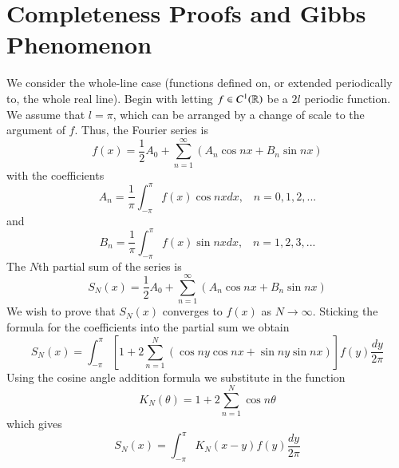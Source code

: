 \section{Completeness Proofs and Gibbs Phenomenon}


We consider the whole-line case (functions defined on, or extended periodically to, the whole real line). Begin with letting $f \in C^1(\mathbb R)$ be a $2l$ periodic function. We assume that $l = \pi$, which can be arranged by a change of scale to the argument of $f$. Thus, the Fourier series is \begin{equation*}
    f(x) = \frac{1}{2}A_0 + \sum_{n=1}^{\infty}(A_n\cos nx+B_n\sin nx)
\end{equation*}
with the coefficients \begin{equation*}
    A_n = \frac{1}{\pi}\int_{-\pi}^{\pi}f(x)\cos nxdx,\;\;\;n=0,1,2,...
\end{equation*}
and \begin{equation*}
    B_n = \frac{1}{\pi}\int_{-\pi}^{\pi}f(x)\sin nxdx,\;\;\;n=1,2,3,...
\end{equation*}
The $N$th partial sum of the series is \begin{equation*}
    S_N(x) = \frac{1}{2}A_0 + \sum_{n=1}^{\infty}(A_n\cos nx+B_n\sin nx)
\end{equation*}
We wish to prove that $S_N(x)$ converges to $f(x)$ as $N\rightarrow \infty$. Sticking the formula for the coefficients into the partial sum we obtain \begin{equation*}
    S_N(x)=\int_{-\pi}^{\pi}\left[1+2\sum_{n=1}^N(\cos ny\cos nx + \sin ny\sin nx)\right]f(y)\frac{dy}{2\pi}
\end{equation*}
Using the cosine angle addition formula we substitute in the function \begin{equation*}
    K_N(\theta) = 1+2\sum_{n=1}^N\cos n\theta
\end{equation*}
which gives \begin{equation*}
    S_N(x) = \int_{-\pi}^{\pi}K_N(x-y)f(y)\frac{dy}{2\pi}
\end{equation*}

